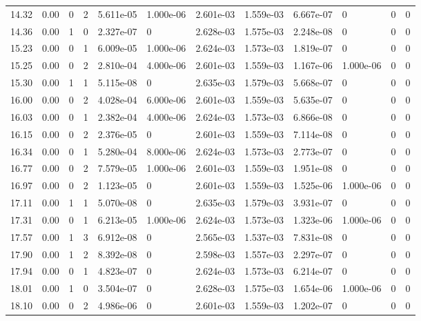 \documentclass[preview]{standalone}
\begin{document}
{{{\begin{tabular}{L{1.2cm}C{1.2cm} C{0.3cm}C{0.5cm} C{1.4cm}C{1.4cm} C{1.4cm}C{1.4cm} C{1.6cm}C{1.6cm} C{1.6cm}C{1.6cm}}
  14.32  &  0.00  & 0     &  2 &  5.611e-05  & 1.000e-06  &  2.601e-03&   1.559e-03& 6.667e-07 & 0   &  0 & 0  \\ 
  14.36  &  0.00  & 1     &  0 &  2.327e-07  & 0  &  2.628e-03&   1.575e-03& 2.248e-08 & 0   &  0 & 0  \\ 
  15.23  &  0.00  & 0     &  1 &  6.009e-05  & 1.000e-06  &  2.624e-03&   1.573e-03& 1.819e-07 & 0   &  0 & 0  \\ 
  15.25  &  0.00  & 0     &  2 &  2.810e-04  & 4.000e-06  &  2.601e-03&   1.559e-03& 1.167e-06 & 1.000e-06   &  0 & 0  \\ 
  15.30  &  0.00  & 1     &  1 &  5.115e-08  & 0  &  2.635e-03&   1.579e-03& 5.668e-07 & 0   &  0 & 0  \\ 
  16.00  &  0.00  & 0     &  2 &  4.028e-04  & 6.000e-06  &  2.601e-03&   1.559e-03& 5.635e-07 & 0   &  0 & 0  \\ 
  16.03  &  0.00  & 0     &  1 &  2.382e-04  & 4.000e-06  &  2.624e-03&   1.573e-03& 6.866e-08 & 0   &  0 & 0  \\ 
  16.15  &  0.00  & 0     &  2 &  2.376e-05  & 0  &  2.601e-03&   1.559e-03& 7.114e-08 & 0   &  0 & 0  \\ 
  16.34  &  0.00  & 0     &  1 &  5.280e-04  & 8.000e-06  &  2.624e-03&   1.573e-03& 2.773e-07 & 0   &  0 & 0  \\ 
  16.77  &  0.00  & 0     &  2 &  7.579e-05  & 1.000e-06  &  2.601e-03&   1.559e-03& 1.951e-08 & 0   &  0 & 0  \\ 
  16.97  &  0.00  & 0     &  2 &  1.123e-05  & 0  &  2.601e-03&   1.559e-03& 1.525e-06 & 1.000e-06   &  0 & 0  \\ 
  17.11  &  0.00  & 1     &  1 &  5.070e-08  & 0  &  2.635e-03&   1.579e-03& 3.931e-07 & 0   &  0 & 0  \\ 
  17.31  &  0.00  & 0     &  1 &  6.213e-05  & 1.000e-06  &  2.624e-03&   1.573e-03& 1.323e-06 & 1.000e-06   &  0 & 0  \\ 
  17.57  &  0.00  & 1     &  3 &  6.912e-08  & 0  &  2.565e-03&   1.537e-03& 7.831e-08 & 0   &  0 & 0  \\ 
  17.90  &  0.00  & 1     &  2 &  8.392e-08  & 0  &  2.598e-03&   1.557e-03& 2.297e-07 & 0   &  0 & 0  \\ 
  17.94  &  0.00  & 0     &  1 &  4.823e-07  & 0  &  2.624e-03&   1.573e-03& 6.214e-07 & 0   &  0 & 0  \\ 
  18.01  &  0.00  & 1     &  0 &  3.504e-07  & 0  &  2.628e-03&   1.575e-03& 1.654e-06 & 1.000e-06   &  0 & 0  \\ 
  18.10  &  0.00  & 0     &  2 &  4.986e-06  & 0  &  2.601e-03&   1.559e-03& 1.202e-07 & 0   &  0 & 0  \\ 

\end{tabular}}}}
\end{document}
